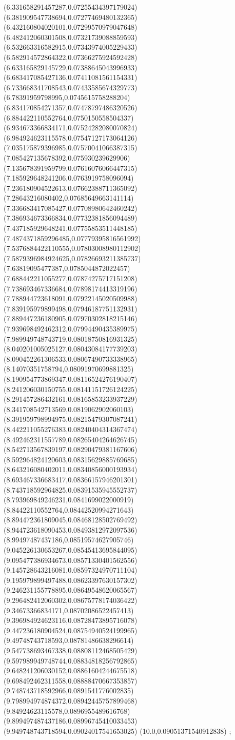 {(6.331658291457287,0.07255434397179024)
(6.381909547738694,0.07277469480132365)
(6.432160804020101,0.07299570979047648)
(6.482412060301508,0.07321739088859593)
(6.532663316582915,0.07343974005229433)
(6.582914572864322,0.07366275924592428)
(6.633165829145729,0.07388645043996933)
(6.683417085427136,0.07411081561154331)
(6.733668341708543,0.07433585674329773)
(6.78391959798995,0.0745615758288204)
(6.834170854271357,0.07478797486320526)
(6.884422110552764,0.0750150558504337)
(6.934673366834171,0.07524282080070824)
(6.984924623115578,0.07547127173064126)
(7.035175879396985,0.07570041066387315)
(7.085427135678392,0.075930239629906)
(7.135678391959799,0.07616076066447315)
(7.185929648241206,0.0763919758096094)
(7.236180904522613,0.07662388711365092)
(7.28643216080402,0.07685649663141114)
(7.336683417085427,0.07708980642460242)
(7.386934673366834,0.07732381856094489)
(7.437185929648241,0.07755853511448185)
(7.4874371859296485,0.07779395816561992)
(7.5376884422110555,0.07803008980112902)
(7.5879396984924625,0.07826693211385737)
(7.63819095477387,0.0785044872022457)
(7.688442211055277,0.07874275717151208)
(7.738693467336684,0.07898174413319196)
(7.788944723618091,0.07922145020509988)
(7.839195979899498,0.07946187751132931)
(7.889447236180905,0.07970302818215146)
(7.939698492462312,0.07994490435389975)
(7.989949748743719,0.08018750816931325)
(8.040201005025127,0.08043084177739203)
(8.090452261306533,0.08067490733338965)
(8.14070351758794,0.08091970699881325)
(8.190954773869347,0.08116524276190407)
(8.241206030150755,0.08141151726124225)
(8.291457286432161,0.08165853233937229)
(8.341708542713569,0.0819062902060103)
(8.391959798994975,0.08215479307087241)
(8.442211055276383,0.08240404314367474)
(8.492462311557789,0.08265404264626745)
(8.542713567839197,0.08290479381167606)
(8.592964824120603,0.08315629885769685)
(8.643216080402011,0.08340856000193934)
(8.693467336683417,0.08366157946201301)
(8.743718592964825,0.08391535945552737)
(8.793969849246231,0.0841699022000919)
(8.84422110552764,0.08442520994271643)
(8.894472361809045,0.08468128502769492)
(8.944723618090453,0.08493812972097536)
(8.99497487437186,0.08519574627905746)
(9.045226130653267,0.08545413695844095)
(9.095477386934673,0.08571330401562556)
(9.145728643216081,0.08597324970711104)
(9.195979899497488,0.08623397630157302)
(9.246231155778895,0.08649548620065567)
(9.296482412060302,0.08675778174036422)
(9.34673366834171,0.08702086522457413)
(9.396984924623116,0.08728473895716078)
(9.447236180904524,0.08754940524199965)
(9.49748743718593,0.08781486638296614)
(9.547738693467338,0.08808112468505429)
(9.597989949748744,0.08834818256792865)
(9.648241206030152,0.08861604244675518)
(9.698492462311558,0.08888470667353857)
(9.748743718592966,0.0891541776002835)
(9.798994974874372,0.08942445757899468)
(9.84924623115578,0.0896955489616768)
(9.899497487437186,0.08996745410033453)
(9.949748743718594,0.09024017541653025)
(10.0,0.09051371540912838)
};
